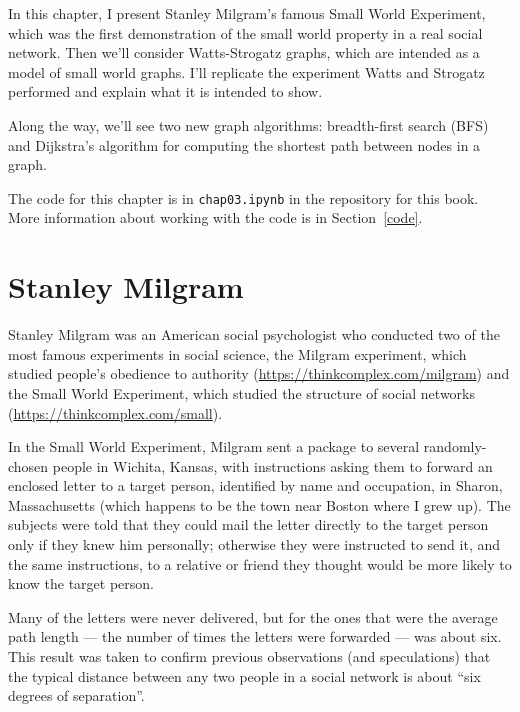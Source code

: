 \documentclass[12pt]{book}
\theoremstyle{exercise}
\begin{document}
In this chapter, I present Stanley Milgram's famous Small World
Experiment, which was the first demonstration of
the small world property in a real social network.  Then we'll
consider Watts-Strogatz graphs, which are intended as a model of
small world graphs.  I'll replicate the experiment Watts and Strogatz performed and explain what it is intended to show.

Along the way, we'll see two new graph algorithms: breadth-first
search (BFS) and Dijkstra's algorithm for computing the shortest
path between nodes in a graph.

The code for this chapter is in {\tt chap03.ipynb} in the repository
for this book.  More information about working with the code is
in Section~\ref{code}.

\section{Stanley Milgram}

Stanley Milgram was an American social psychologist who conducted
two of the most famous experiments in social science, the
Milgram experiment, which studied people's obedience to authority
(\url{https://thinkcomplex.com/milgram})
and the Small World Experiment, which studied
the structure of social networks
(\url{https://thinkcomplex.com/small}).


In the Small World Experiment, Milgram sent a package to several
randomly-chosen people in Wichita, Kansas, with instructions asking
them to forward an enclosed letter to a target person, identified by
name and occupation, in Sharon, Massachusetts (which happens to be the town near
Boston where I grew up).  The subjects were told that they could mail
the letter directly to the target person only if they knew him
personally; otherwise they were instructed to send it, and the same
instructions, to a relative or friend they thought would be more
likely to know the target person.


Many of the letters were never delivered, but for the ones that
were the average path length --- the number of
times the letters were forwarded --- was about six.  This result
was taken to confirm previous observations (and speculations) that
the typical distance between any two people in a social network
is about ``six degrees of separation''.
\end{document}

